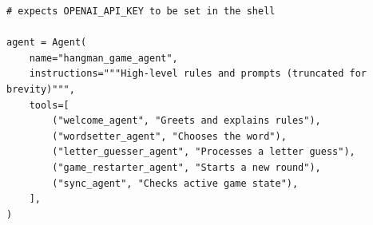 \begin{lstlisting}[style=pystyle,
                   caption={Essential agent scaffold},
                   label={lst:agent}]
# expects OPENAI_API_KEY to be set in the shell

agent = Agent(
    name="hangman_game_agent",
    instructions="""High-level rules and prompts (truncated for brevity)""",
    tools=[
        ("welcome_agent", "Greets and explains rules"),
        ("wordsetter_agent", "Chooses the word"),
        ("letter_guesser_agent", "Processes a letter guess"),
        ("game_restarter_agent", "Starts a new round"),
        ("sync_agent", "Checks active game state"),
    ],
)
\end{lstlisting}
